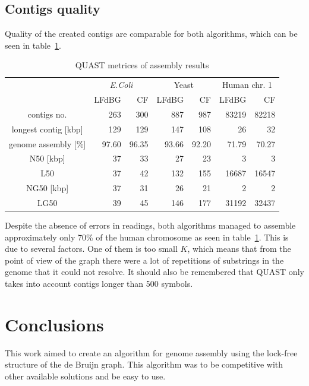 \documentclass[12pt]{article}
\begin{document}
\subsection{Contigs quality}

Quality of the created contigs are comparable for both algorithms, which can be seen in table~\ref{tab:quality}.

\begin{table}[!htb]
\caption{QUAST metrices of assembly results\label{tab:quality}}
\centering
\begin{tabular}{|c|r|r|r|r|r|r|}
  \hline
  ~ & \multicolumn{2}{c|}{\textit{E.Coli}} & \multicolumn{2}{c|}{Yeast} & \multicolumn{2}{c|}{Human chr. 1}\\
  ~ & LFdBG & CF & LFdBG & CF & LFdBG & CF \\
 \hline
 contigs no.            & 263    & 300    & 887    & 987    & 83219 & 82218 \\
 longest contig [kbp]   & 129    & 129    & 147    & 108    & 26    & 32    \\
 genome assembly [\%]   & 97.60  & 96.35  & 93.66  & 92.20  & 71.79 & 70.27 \\
 N50   [kbp]            & 37  & 33  & 27  & 23  & 3  & 3  \\
 L50                    & 37     & 42     & 132    & 155    & 16687 & 16547 \\
 NG50  [kbp]            &37   & 31  & 26  & 21  & 2  & 2  \\
 LG50                   & 39     & 45     & 146    & 177    & 31192 & 32437 \\
 \hline
\end{tabular}
\end{table}

Despite the absence of errors in readings, both algorithms managed to assemble approximately only 70\% of the human chromosome as seen in table~\ref{tab:quality}. This is due to several factors. One of them is too small $K$, which means that from the point of view of the graph there were a lot of repetitions of substrings in the genome that it could not resolve. It should also be remembered that QUAST only takes into account contigs longer than 500 symbols.


\section{Conclusions}

This work aimed to create an algorithm for genome assembly using the lock-free structure of the de Bruijn graph. This algorithm was to be competitive with other available solutions and be easy to use.
\end{document}
